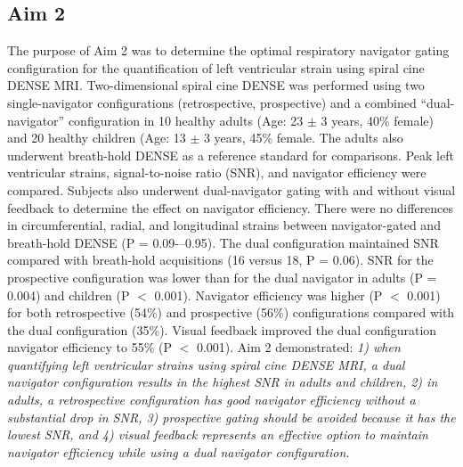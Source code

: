 \subsection{Aim 2}
	The purpose of Aim 2 was to determine the optimal respiratory navigator gating configuration for the quantification of left ventricular strain using spiral cine DENSE MRI. Two-dimensional spiral cine DENSE was performed using two single-navigator configurations (retrospective, prospective) and a combined “dual-navigator” configuration in 10 healthy adults (Age: 23 $\pm$ 3 years, 40\% female) and 20 healthy children  (Age: 13 $\pm$ 3 years, 45\% female. The adults also underwent breath-hold DENSE as a reference standard for comparisons. Peak left ventricular strains, signal-to-noise ratio (SNR), and navigator efficiency were compared. Subjects also underwent dual-navigator gating with and without visual feedback to determine the effect on navigator efficiency. There were no differences in circumferential, radial, and longitudinal strains between navigator-gated and breath-hold DENSE (P = 0.09-–0.95). The dual configuration maintained SNR compared with breath-hold acquisitions (16 versus 18, P = 0.06). SNR for the prospective configuration was lower than for the dual navigator in adults (P = 0.004) and children (P $<$ 0.001). Navigator efficiency was higher (P $<$ 0.001) for both retrospective (54\%) and prospective (56\%) configurations compared with the dual configuration (35\%). Visual feedback improved the dual configuration navigator efficiency to 55\% (P $<$ 0.001). Aim 2 demonstrated: \textit{1) when quantifying left ventricular strains using spiral cine DENSE MRI, a dual navigator configuration results in the highest SNR in adults and children, 2) in adults, a retrospective configuration has good navigator efficiency without a substantial drop in SNR, 3) prospective gating should be avoided because it has the lowest SNR, and 4) visual feedback represents an effective option to maintain navigator efficiency while using a dual navigator configuration.}

